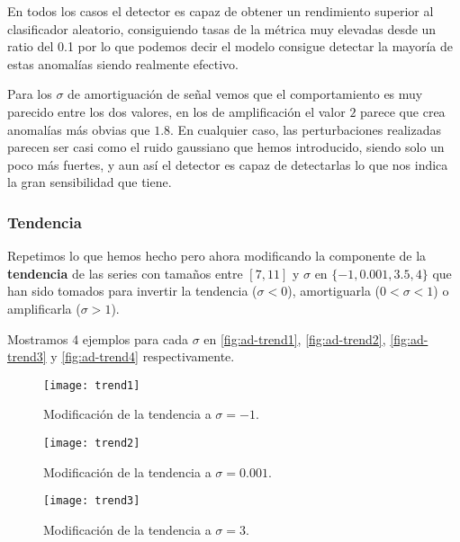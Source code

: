 En todos los casos el detector es capaz de obtener un rendimiento superior al clasificador aleatorio, consiguiendo tasas de la métrica muy elevadas desde un ratio del 0.1 por lo que podemos decir el modelo consigue detectar la mayoría de estas anomalías siendo realmente efectivo.

Para los $\sigma$ de amortiguación de señal vemos que el comportamiento es muy parecido entre los dos valores, en los de amplificación el valor $2$ parece que crea anomalías más obvias que $1.8$. En cualquier caso, las perturbaciones realizadas parecen ser casi como el ruido gaussiano que hemos introducido, siendo solo un poco más fuertes, y aun así el detector es capaz de detectarlas lo que nos indica la gran sensibilidad que tiene.

\subsubsection{Tendencia}

Repetimos lo que hemos hecho pero ahora modificando la componente de la \textbf{tendencia} de las series con tamaños entre $[7, 11]$ y $\sigma$ en $\{-1, 0.001, 3.5, 4\}$ que han sido tomados para invertir la tendencia ($\sigma < 0$), amortiguarla ($0 < \sigma < 1$) o amplificarla ($\sigma > 1$).

Mostramos 4 ejemplos para cada $\sigma$ en \autoref{fig:ad-trend1}, \autoref{fig:ad-trend2}, \autoref{fig:ad-trend3} y \autoref{fig:ad-trend4} respectivamente.

\begin{figure}[htpb]
  \centering
  \texttt{[image: trend1]}
  \caption{Modificación de la tendencia a $\sigma = -1$.}
  \label{fig:ad-trend1}
\end{figure}

\begin{figure}[htpb]
  \centering
  \texttt{[image: trend2]}
  \caption{Modificación de la tendencia a $\sigma = 0.001$.}
  \label{fig:ad-trend2}
\end{figure}


\begin{figure}[htpb]
  \centering
  \texttt{[image: trend3]}
  \caption{Modificación de la tendencia a $\sigma = 3$.}
  \label{fig:ad-trend3}
\end{figure}


